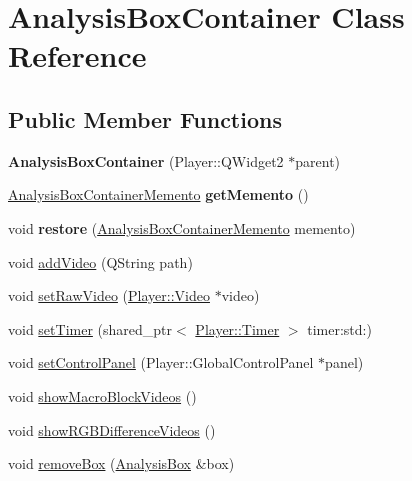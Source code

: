 \hypertarget{classAnalysisBoxContainer}{}\section{Analysis\+Box\+Container Class Reference}
\label{classAnalysisBoxContainer}
\subsection*{Public Member Functions}
\begin{DoxyCompactItemize}
\item 
\hypertarget{classAnalysisBoxContainer_afd0028b75819b4b6b0204e43c3b663c2}{}{\bfseries Analysis\+Box\+Container} (Player\+::\+Q\+Widget2 $\ast$parent)\label{classAnalysisBoxContainer_afd0028b75819b4b6b0204e43c3b663c2}

\item 
\hypertarget{classAnalysisBoxContainer_a490b0483a46b9ca4846c489a72670b8c}{}\hyperlink{classAnalysisBoxContainerMemento}{Analysis\+Box\+Container\+Memento} {\bfseries get\+Memento} ()\label{classAnalysisBoxContainer_a490b0483a46b9ca4846c489a72670b8c}

\item 
\hypertarget{classAnalysisBoxContainer_a18dc4cae1982fdf54a49959742ae2f59}{}void {\bfseries restore} (\hyperlink{classAnalysisBoxContainerMemento}{Analysis\+Box\+Container\+Memento} memento)\label{classAnalysisBoxContainer_a18dc4cae1982fdf54a49959742ae2f59}

\item 
void \hyperlink{classAnalysisBoxContainer_af3b761e148d9cb7352c5ffb4bf4c66bd}{add\+Video} (Q\+String path)
\item 
void \hyperlink{classAnalysisBoxContainer_a2b6f9916ed9f525eae2c47fab4275ddf}{set\+Raw\+Video} (\hyperlink{classPlayer_1_1Video}{Player\+::\+Video} $\ast$video)
\item 
void \hyperlink{classAnalysisBoxContainer_ae85e1178ac5c0f822c6311134f04b6f2}{set\+Timer} (shared\+\_\+ptr$<$ \hyperlink{classPlayer_1_1Timer}{Player\+::\+Timer} $>$ timer\+:std\+:)
\item 
void \hyperlink{classAnalysisBoxContainer_a9c1b482d1dcd6a733b84a9cdcc960263}{set\+Control\+Panel} (Player\+::\+Global\+Control\+Panel $\ast$panel)
\item 
void \hyperlink{classAnalysisBoxContainer_ab3d9dc42d8e78c5bf6f87c5e93bdf1ce}{show\+Macro\+Block\+Videos} ()
\item 
void \hyperlink{classAnalysisBoxContainer_a91638333a4b3fe577fd2062f2aa667f3}{show\+R\+G\+B\+Difference\+Videos} ()
\item 
void \hyperlink{classAnalysisBoxContainer_ace9070f3e0c9e782b87033128dacea3a}{remove\+Box} (\hyperlink{classAnalysisBox}{Analysis\+Box} \&box)
\end{DoxyCompactItemize}


